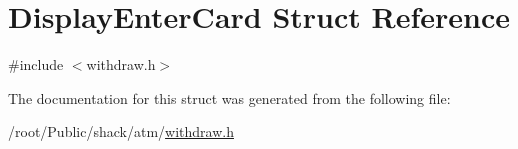 \hypertarget{structDisplayEnterCard}{\section{Display\-Enter\-Card Struct Reference}
\label{structDisplayEnterCard}
}


{\ttfamily \#include $<$withdraw.\-h$>$}



The documentation for this struct was generated from the following file\-:\begin{DoxyCompactItemize}
\item 
/root/\-Public/shack/atm/\hyperlink{withdraw_8h}{withdraw.\-h}\end{DoxyCompactItemize}
